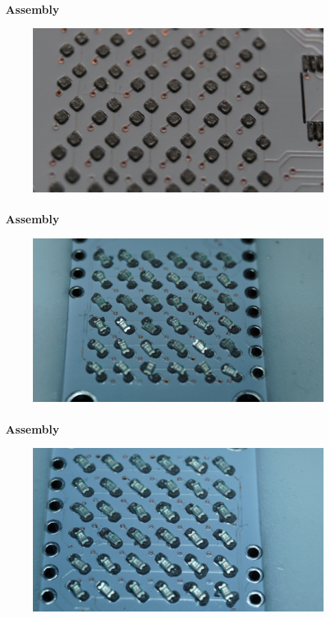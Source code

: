 \documentclass[t]{beamer}
\begin{document}
\begin{frame}
\frametitle{Assembly}
\begin{figure}
	\includegraphics[width=\linewidth]{assembly/assm6.JPG}
\end{figure}
\end{frame}
\begin{frame}
\frametitle{Assembly}
\begin{figure}
	\includegraphics[width=\linewidth]{assembly/assm7.JPG}
\end{figure}
\end{frame}
\begin{frame}
	\frametitle{Assembly}
	\begin{figure}
		\includegraphics[width=\linewidth]{assembly/assm8.JPG}
	\end{figure}
\end{frame}
\end{document}
